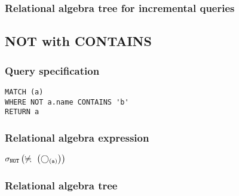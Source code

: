 \subsubsection*{Relational algebra tree for incremental queries}


\subsection{NOT with CONTAINS}

\subsubsection*{Query specification}

\begin{lstlisting}
MATCH (a)
WHERE NOT a.name CONTAINS 'b'
RETURN a
\end{lstlisting}

\subsubsection*{Relational algebra expression}

$\selection{\mathtt{NOT}} \left(\alldifferent{} \left(\getvertices{a}{}\right)\right)$

\subsubsection*{Relational algebra tree}


